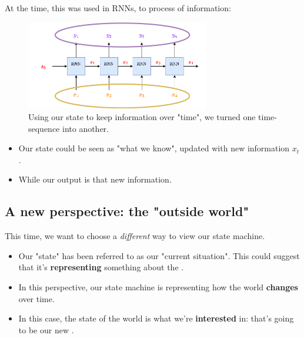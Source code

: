         At the time, this was used in RNNs, to process  of information:
    
        \begin{figure}[H]
            \centering
            \includegraphics[width=80mm,scale=0.5]{images/rnn_images/gathered_sequence.png}
            
            \caption*{Using our state to keep information over "time", we turned one time-sequence into another.}
        \end{figure}

        \begin{itemize}
            \item Our state could be seen as "what we know", updated with new information $x_t$.
    
            \item While our output is  that new information.
        \end{itemize}
    


    \phantom{}

    \subsection{A new perspective: the "outside world"}

        This time, we want to choose a \textit{different} way to view our state machine.
        
        \begin{itemize}
            \item Our "state" has been referred to as our "current situation". This could suggest that it's \textbf{representing} something about the .
            
            \item In this perspective, our state machine is representing how the world \textbf{changes} over time.
            
            \item  In this case, the state of the world is what we're \textbf{interested} in: that's going to be our new .\\
        \end{itemize}

